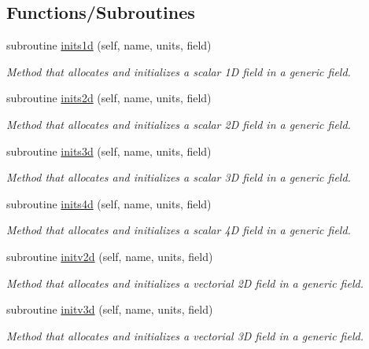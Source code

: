 \subsection*{Functions/\+Subroutines}
\begin{DoxyCompactItemize}
\item 
subroutine \mbox{\hyperlink{namespacefieldtypes__mod_a3f1571ad15733a3f2fff43e35f309416}{inits1d}} (self, name, units, field)
\begin{DoxyCompactList}\small\item\em Method that allocates and initializes a scalar 1D field in a generic field. \end{DoxyCompactList}\item 
subroutine \mbox{\hyperlink{namespacefieldtypes__mod_ad3329e97ec60bf9226d19be45ed21859}{inits2d}} (self, name, units, field)
\begin{DoxyCompactList}\small\item\em Method that allocates and initializes a scalar 2D field in a generic field. \end{DoxyCompactList}\item 
subroutine \mbox{\hyperlink{namespacefieldtypes__mod_a750ce2c729d98ea7031c839a3a5ebd7c}{inits3d}} (self, name, units, field)
\begin{DoxyCompactList}\small\item\em Method that allocates and initializes a scalar 3D field in a generic field. \end{DoxyCompactList}\item 
subroutine \mbox{\hyperlink{namespacefieldtypes__mod_a1987bd94293cfd9e35016ac5992501cd}{inits4d}} (self, name, units, field)
\begin{DoxyCompactList}\small\item\em Method that allocates and initializes a scalar 4D field in a generic field. \end{DoxyCompactList}\item 
subroutine \mbox{\hyperlink{namespacefieldtypes__mod_ad1af664e23793260f9c2fcd03829a1f5}{initv2d}} (self, name, units, field)
\begin{DoxyCompactList}\small\item\em Method that allocates and initializes a vectorial 2D field in a generic field. \end{DoxyCompactList}\item 
subroutine \mbox{\hyperlink{namespacefieldtypes__mod_aa0a152c9e5131d3003cc34e4f3b2974d}{initv3d}} (self, name, units, field)
\begin{DoxyCompactList}\small\item\em Method that allocates and initializes a vectorial 3D field in a generic field. \end{DoxyCompactList}\item 

\end{DoxyCompactItemize}
